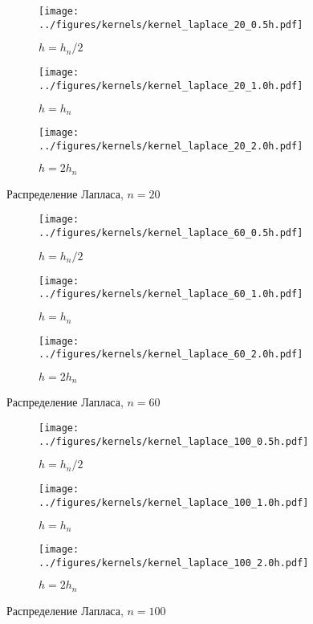 \documentclass[12pt]{report}
\begin{document}
	\begin{figure}[H]
		\centering
		\begin{subfigure}[t]{.3\linewidth}
			\centering\texttt{[image: ../figures/kernels/kernel\_laplace\_20\_0.5h.pdf]}
			\caption*{$h = h_n/2$}
		\end{subfigure}
		\begin{subfigure}[t]{.3\linewidth}
			\centering\texttt{[image: ../figures/kernels/kernel\_laplace\_20\_1.0h.pdf]}
			\caption*{$h = h_n$}
		\end{subfigure}
		\begin{subfigure}[t]{.3\linewidth}
			\centering\texttt{[image: ../figures/kernels/kernel\_laplace\_20\_2.0h.pdf]}
			\caption*{$h = 2h_n$}
		\end{subfigure}
		\caption{Распределение Лапласа, $n = 20$}
	\end{figure}
	\begin{figure}[H]
		\centering
		\begin{subfigure}[t]{.3\linewidth}
			\centering\texttt{[image: ../figures/kernels/kernel\_laplace\_60\_0.5h.pdf]}
			\caption*{$h = h_n/2$}
		\end{subfigure}
		\begin{subfigure}[t]{.3\linewidth}
			\centering\texttt{[image: ../figures/kernels/kernel\_laplace\_60\_1.0h.pdf]}
			\caption*{$h = h_n$}
		\end{subfigure}
		\begin{subfigure}[t]{.3\linewidth}
			\centering\texttt{[image: ../figures/kernels/kernel\_laplace\_60\_2.0h.pdf]}
			\caption*{$h = 2h_n$}
		\end{subfigure}
		\caption{Распределение Лапласа, $n = 60$}
	\end{figure}
	\begin{figure}[H]
		\centering
		\begin{subfigure}[t]{.3\linewidth}
			\centering\texttt{[image: ../figures/kernels/kernel\_laplace\_100\_0.5h.pdf]}
			\caption*{$h = h_n/2$}
		\end{subfigure}
		\begin{subfigure}[t]{.3\linewidth}
			\centering\texttt{[image: ../figures/kernels/kernel\_laplace\_100\_1.0h.pdf]}
			\caption*{$h = h_n$}
		\end{subfigure}
		\begin{subfigure}[t]{.3\linewidth}
			\centering\texttt{[image: ../figures/kernels/kernel\_laplace\_100\_2.0h.pdf]}
			\caption*{$h = 2h_n$}
		\end{subfigure}
		\caption{Распределение Лапласа, $n = 100$}
	\end{figure}
\end{document}
